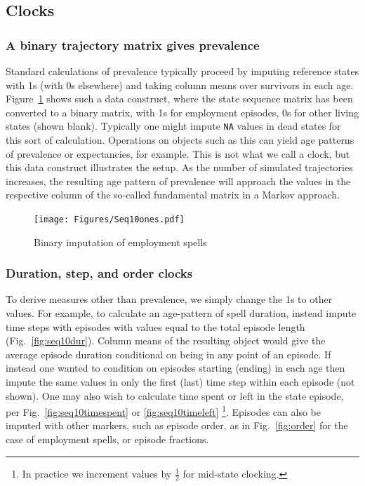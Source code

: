 \documentclass{article}
\begin{document}
\FloatBarrier

\subsection{Clocks}
\label{sec:clocks}

\subsubsection{A binary trajectory matrix gives prevalence}
Standard calculations of prevalence typically proceed by imputing reference states with 1s (with 0s elsewhere) and taking column means over survivors in each age. Figure~\ref{fig:seq10ones} shows such a data construct, where the state sequence matrix has been converted to a binary matrix, with 1s for employment episodes, 0s for other living states (shown blank). Typically one might impute \texttt{NA} values in dead states for this sort of calculation. Operations on objects such as this can yield age patterns of prevalence or expectancies, for example. This is not what we call a clock, but this data construct illustrates the setup. As the number of simulated trajectories increases, the resulting age pattern of prevalence will approach the values in the respective column of the so-called fundamental matrix in a Markov approach.

\begin{figure}[ht!]
\centering
\texttt{[image: Figures/Seq10ones.pdf]}
\caption{Binary imputation of employment spells}
\label{fig:seq10ones}
\end{figure}

\subsubsection{Duration, step, and order clocks}
To derive measures other than prevalence, we simply change the 1s to other values. For example, to calculate an age-pattern of spell duration, instead impute time steps with episodes with values equal to the total episode length (Fig.~\ref{fig:seq10dur}). Column means of the resulting object would give the average episode duration conditional on being in any point of an episode. If instead one wanted to condition on episodes starting (ending) in each age then impute the same values in only the first (last) time step within each episode (not shown). One may also wish to calculate time spent or left in the state episode, per Fig.~\ref{fig:seq10timespent} or \ref{fig:seq10timeleft} \footnote{In practice we increment values by $\frac{1}{2}$ for mid-state clocking.}. Episodes can also be imputed with other markers, such as episode order, as in Fig.~\ref{fig:order} for the case of employment spells, or episode fractions. 
\end{document}
